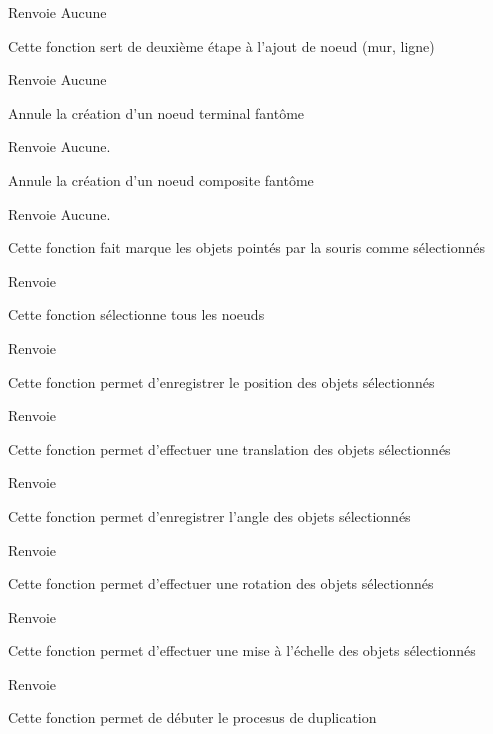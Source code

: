 \begin{DoxyReturn}{Renvoie}
Aucune
\end{DoxyReturn}
Cette fonction sert de deuxième étape à l'ajout de noeud (mur, ligne)

\begin{DoxyReturn}{Renvoie}
Aucune
\end{DoxyReturn}
Annule la création d'un noeud terminal fantôme

\begin{DoxyReturn}{Renvoie}
Aucune.
\end{DoxyReturn}
Annule la création d'un noeud composite fantôme

\begin{DoxyReturn}{Renvoie}
Aucune.
\end{DoxyReturn}
Cette fonction fait marque les objets pointés par la souris comme sélectionnés

\begin{DoxyReturn}{Renvoie}

\end{DoxyReturn}
Cette fonction sélectionne tous les noeuds

\begin{DoxyReturn}{Renvoie}

\end{DoxyReturn}
Cette fonction permet d'enregistrer le position des objets sélectionnés

\begin{DoxyReturn}{Renvoie}

\end{DoxyReturn}
Cette fonction permet d'effectuer une translation des objets sélectionnés

\begin{DoxyReturn}{Renvoie}

\end{DoxyReturn}
Cette fonction permet d'enregistrer l'angle des objets sélectionnés

\begin{DoxyReturn}{Renvoie}

\end{DoxyReturn}
Cette fonction permet d'effectuer une rotation des objets sélectionnés

\begin{DoxyReturn}{Renvoie}

\end{DoxyReturn}
Cette fonction permet d'effectuer une mise à l'échelle des objets sélectionnés

\begin{DoxyReturn}{Renvoie}

\end{DoxyReturn}
Cette fonction permet de débuter le procesus de duplication


